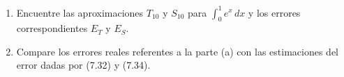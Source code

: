 \item 
    \begin{enumerate}
        \item[(a)] Encuentre las aproximaciones $T_{10}$ y $S_{10}$ para $\int_{0}^{1} e^x \, dx$ y los errores correspondientes $E_T$ y $E_S$.
        \item[(b)] Compare los errores reales referentes a la parte (a) con las estimaciones del error dadas por (7.32) y (7.34).
    \end{enumerate}
